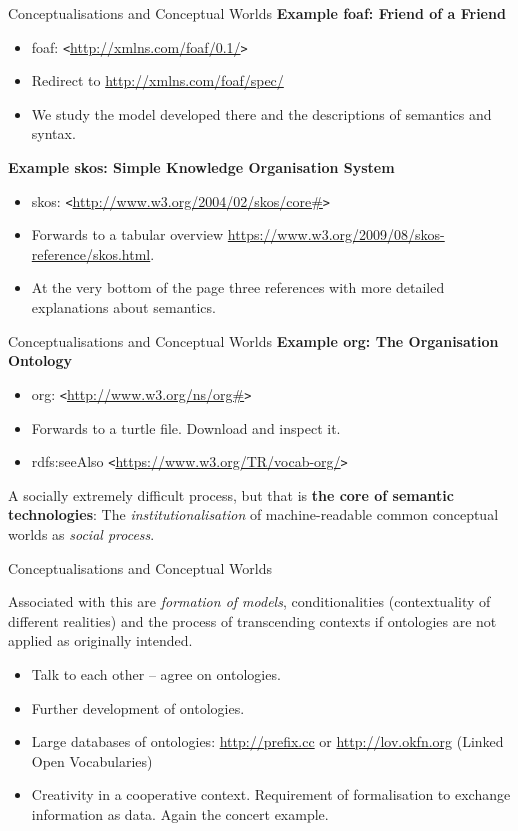 \documentclass{beamer}
\def\lt{\texttt{<}}
\def\gt{\texttt{>}}
\begin{document}
\begin{frame}{Conceptualisations and Conceptual Worlds}
\textbf{Example foaf: Friend of a Friend}
\begin{itemize}
\item foaf: {\lt}\url{http://xmlns.com/foaf/0.1/}{\gt}
\item Redirect to \url{http://xmlns.com/foaf/spec/}
\item We study the model developed there and the descriptions of semantics and
  syntax.
\end{itemize}

\textbf{Example skos: Simple Knowledge Organisation System}
\begin{itemize}
\item skos: {\lt}\url{http://www.w3.org/2004/02/skos/core\#}{\gt}
\item Forwards to a tabular overview
  \url{https://www.w3.org/2009/08/skos-reference/skos.html}.
\item At the very bottom of the page three references with more detailed
  explanations about semantics.
\end{itemize}
\end{frame}

\begin{frame}{Conceptualisations and Conceptual Worlds}
\textbf{Example org: The Organisation Ontology}
\begin{itemize}
\item org: {\lt}\url{http://www.w3.org/ns/org\#}{\gt}
\item Forwards to a turtle file. Download and inspect it.
\item rdfs:seeAlso {\lt}\url{https://www.w3.org/TR/vocab-org/}{\gt}
\end{itemize}

A socially extremely difficult process, but that is \textbf{the core of
  semantic technologies}: The \emph{institutionalisation} of machine-readable
common conceptual worlds as \emph{social process}.

\end{frame}

\begin{frame}{Conceptualisations and Conceptual Worlds}

Associated with this are \emph{formation of models}, conditionalities
(contextuality of different realities) and the process of transcending
contexts if ontologies are not applied as originally intended.
\begin{itemize}
\item Talk to each other -- agree on ontologies.
\item Further development of ontologies.
\item Large databases of ontologies: \url{http://prefix.cc} or
  \url{http://lov.okfn.org} (Linked Open Vocabularies)
\item Creativity in a cooperative context. Requirement of formalisation to
  exchange information as data.  Again the concert example.
\end{itemize}
\end{frame}
\end{document}
